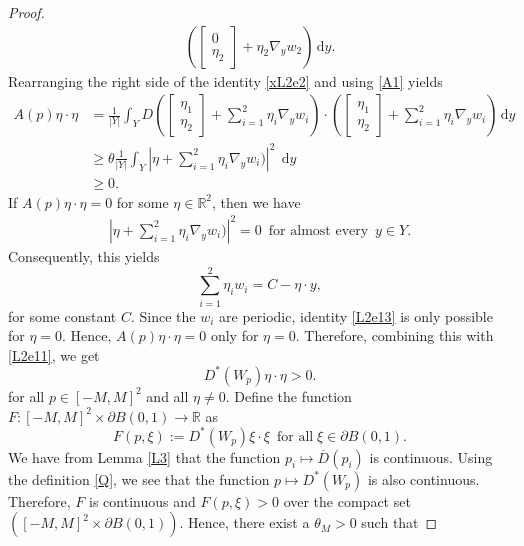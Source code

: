 \documentclass[11pt]{article}
\newcommand{\di}[1]{\,\mathrm{d}#1}
\begin{document}
\begin{proof}
\begin{align}
    (\begin{bmatrix} 0 \\ \eta_2  \end{bmatrix}+\eta_2\nabla_y w_2)\di{y}\label{xL2e2}.
      \end{align}
      Rearranging the right side of the identity \eqref{xL2e2} and using \ref{A1} yields
    \begin{align}
           A(p)\eta\cdot\eta&=\frac{1}{|Y|}\int_Y D(\begin{bmatrix} \eta_1 \\ \eta_2  \end{bmatrix}+\sum_{i=1}^2\eta_i\nabla_yw_i)\cdot 
    (\begin{bmatrix} \eta_1 \\ \eta_2  \end{bmatrix}+\sum_{i=1}^2\eta_i\nabla_yw_i)\di{y}\nonumber\\
    &\geq \theta\frac{1}{|Y|}\int_Y |\eta+ \sum_{i=1}^2\eta_i\nabla_yw_i)|^2\;\di{y}\nonumber\\
    &\geq 0.\label{L2e12}
\end{align}
If $A(p)\eta\cdot\eta=0$ for some $\eta\in \mathbb{R}^2$, then we have
\begin{align*}
|\eta+ \sum_{i=1}^2\eta_i\nabla_yw_i)|^2=0 \,\,\,\mbox{for almost every }\, y\in Y.
\end{align*}
Consequently, this yields
\begin{equation}
\sum_{i=1}^2\eta_iw_i=C-\eta\cdot y,\label{L2e13}
\end{equation}
for some constant $C $.
Since the $w_i$ are periodic, identity \eqref{L2e13} is only possible for $\eta=0$.
Hence, $A(p)\eta\cdot \eta=0$ only for $\eta= 0$.
Therefore, combining this with \eqref{L2e11}, we get
\begin{equation}\label{L2e15}
    D^*(W_p)\eta\cdot \eta> 0.
\end{equation}
for all $p\in [-M,M]^2$ and all $\eta\neq0$.
 Define the function $F:[-M,M]^2\times \partial B(0,1)\rightarrow \mathbb{R}$ as 
\begin{equation*}
    F(p,\xi):= D^*(W_p)\xi\cdot \xi \,\,\,\mbox{for all}\; \xi\in \partial B(0,1).
\end{equation*}
     We have from Lemma \ref{L3} that  the function $p_i\mapsto \overline{D}(p_i)$ is continuous.
     Using the definition \eqref{Q}, we see that the function $p\mapsto D^*(W_p)$ is also continuous.
     Therefore, $F$ is continuous and $F(p,\xi)>0$ over the compact set $ ([-M,M]^2\times \partial B(0,1))$. Hence, there exist a $\theta_M>0$ such that

\end{proof}
\end{document}
